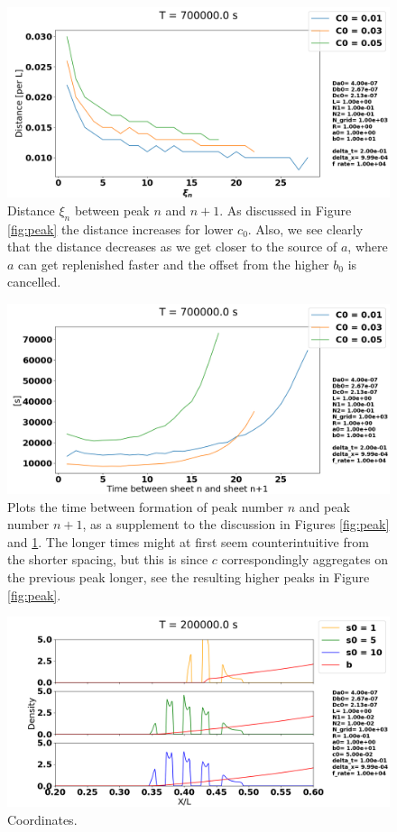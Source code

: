 \documentclass[1p]{elsarticle}        	%
\begin{document}
\begin{figure}
	\centering
	\includegraphics[width=\linewidth]{../figures/deltaC0_x.png}
	\caption{Distance $\xi_n$ between peak $n$ and $n+1$. As discussed in Figure \ref{fig:peak} the distance increases for lower $c_0$. Also, we see clearly that the distance decreases as we get closer to the source of $a$, where $a$ can get replenished faster and the offset from the higher $b_0$ is cancelled.}
	\label{fig:peakx}
\end{figure}

\begin{figure}
	\centering
	\includegraphics[width=\linewidth]{../figures/deltaC0_t.png}
	\caption{Plots the time between formation of peak number $n$ and peak number $n+1$, as a supplement to the discussion in Figures \ref{fig:peak} and \ref{fig:peakx}. The longer times might at first seem counterintuitive from the shorter spacing, but this is since $c$ correspondingly aggregates on the previous peak longer, see the resulting higher peaks in Figure \ref{fig:peak}.}
	\label{fig:coords}
\end{figure}

\begin{figure}
	\centering
	\includegraphics[width=\linewidth]{../figures/s0_1-10.png}
	\caption{Coordinates.}
	\label{fig:coords}
\end{figure}
\end{document}
